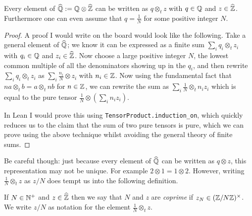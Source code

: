 \begin{lemma}
    \label{QHat.canonicalForm}
    \leanok
    Every element of $\widehat{\mathbb{Q}}:=\mathbb{Q}\otimes\widehat{\mathbb{Z}}$ can be written as $q\otimes_t z$ with $q\in\mathbb{Q}$ and $z\in\widehat{\mathbb{Z}}$.
    Furthermore one can even assume that $q=\frac{1}{N}$ for some positive integer $N$.
\end{lemma}
\begin{proof} \leanok
    A proof I would write on the board would look like the following. Take a general
    element of $\widehat{\mathbb{Q}}$; we know it can be expressed as a finite sum
    $\sum_i q_i\otimes_t z_i$ with $q_i\in\mathbb{Q}$ and $z_i\in\widehat{\mathbb{Z}}$. Now choose a large
    positive integer $N$, the lowest common multiple of all the denominators showing up in the
    $q_i$, and then rewrite $\sum_i q_i\otimes_t z_i$ as $\sum_i \frac{n_i}{N}\otimes z_i$ with
    $n_i\in\mathbb{Z}$. Now using the fundamental fact that $na\otimes_t b=a\otimes_t nb$ for $n\in\mathbb{Z}$,
    we can rewrite the sum as $\sum_i \frac{1}{N}\otimes_t n_i z_i$
    which is equal to the pure tensor $\frac{1}{N}\otimes(\sum_i n_i z_i)$.

    In Lean I would prove this using {\tt TensorProduct.induction\_on}, which quickly
    reduces us to the claim that the sum of two pure tensors is pure, which we can prove
    using the above technique whilst avoiding the general theory of finite sums.
\end{proof}

Be careful though: just because every element of $\widehat{\mathbb{Q}}$ can be written as $q\otimes z$, this
representation may not be unique. For example $2\otimes 1=1\otimes 2$. However, writing
$\frac{1}{N}\otimes_t z$ as $z/N$ does tempt us into the following definition.

\begin{definition}
    \label{QHat.IsCoprime}
    \leanok
    If $N\in\mathbb{N}^+$ and $z\in\widehat{\mathbb{Z}}$ then we say that $N$ and $z$ are \emph{coprime} if
    $z_N\in(\mathbb{Z}/N\mathbb{Z})^\times$. We write $z/N$ as notation
    for the element $\frac{1}{N}\otimes_tz$.
\end{definition}

